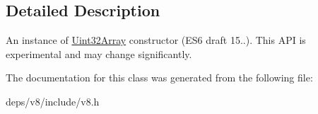 \subsection{Detailed Description}
An instance of \hyperlink{classv8_1_1_uint32_array}{Uint32\+Array} constructor (E\+S6 draft 15..). This A\+P\+I is experimental and may change significantly. 

The documentation for this class was generated from the following file\+:\begin{DoxyCompactItemize}
\item 
deps/v8/include/v8.\+h\end{DoxyCompactItemize}
